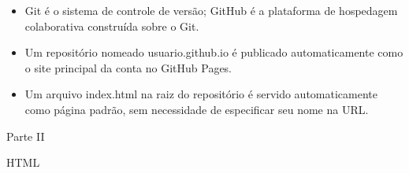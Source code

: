 \begin{itemize}
  \item Git é o sistema de controle de versão; GitHub é a plataforma de hospedagem colaborativa construída sobre o Git.
\end{itemize}

\begin{itemize}
  \item Um repositório nomeado usuario.github.io é publicado automaticamente como o site principal da conta no GitHub Pages.
\end{itemize}

\begin{itemize}
  \item Um arquivo index.html na raiz do repositório é servido automaticamente como página padrão, sem necessidade de especificar seu nome na URL.
\end{itemize}

Parte II

\begin{codebox}{HTML}

\end{codebox}
